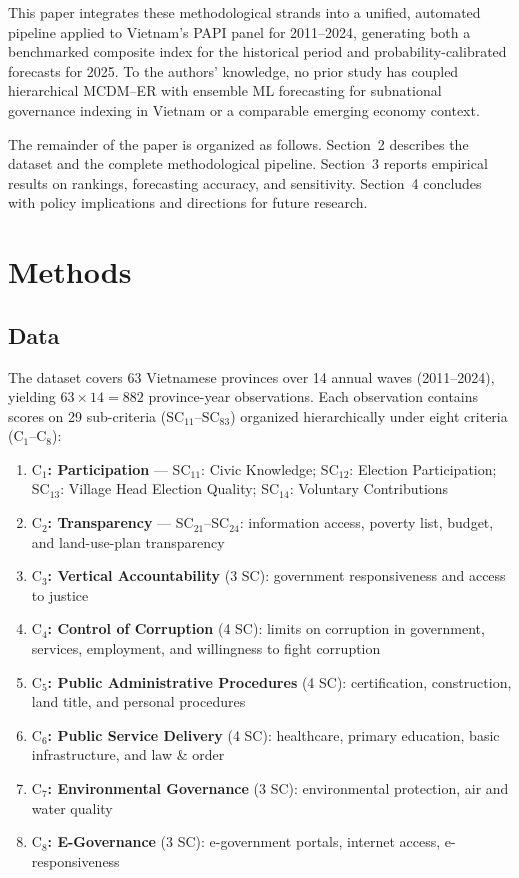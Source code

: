\documentclass[12pt, a4paper]{article}
\begin{document}
This paper integrates these methodological strands into a unified, automated
pipeline applied to Vietnam's PAPI panel for 2011--2024, generating both a
benchmarked composite index for the historical period and probability-calibrated
forecasts for 2025. To the authors' knowledge, no prior study has coupled
hierarchical MCDM--ER with ensemble ML forecasting for subnational governance
indexing in Vietnam or a comparable emerging economy context.

The remainder of the paper is organized as follows.  Section~2 describes the
dataset and the complete methodological pipeline.  Section~3 reports empirical
results on rankings, forecasting accuracy, and sensitivity.  Section~4 concludes
with policy implications and directions for future research.

\section{Methods}

\subsection{Data}

The dataset covers 63 Vietnamese provinces over 14 annual waves
(2011--2024), yielding $63 \times 14 = 882$ province-year observations.
Each observation contains scores on 29 sub-criteria ($\text{SC}_{11}$--$\text{SC}_{83}$)
organized hierarchically under eight criteria ($\text{C}_1$--$\text{C}_8$):

\begin{enumerate}[leftmargin=2em, itemsep=1pt]
  \item \textbf{$\text{C}_1$: Participation} --- SC$_{11}$: Civic Knowledge; SC$_{12}$: Election Participation; SC$_{13}$: Village Head Election Quality; SC$_{14}$: Voluntary Contributions
  \item \textbf{$\text{C}_2$: Transparency} --- SC$_{21}$--SC$_{24}$: information access, poverty list, budget, and land-use-plan transparency
  \item \textbf{$\text{C}_3$: Vertical Accountability} (3 SC): government responsiveness and access to justice
  \item \textbf{$\text{C}_4$: Control of Corruption} (4 SC): limits on corruption in government, services, employment, and willingness to fight corruption
  \item \textbf{$\text{C}_5$: Public Administrative Procedures} (4 SC): certification, construction, land title, and personal procedures
  \item \textbf{$\text{C}_6$: Public Service Delivery} (4 SC): healthcare, primary education, basic infrastructure, and law \& order
  \item \textbf{$\text{C}_7$: Environmental Governance} (3 SC): environmental protection, air and water quality
  \item \textbf{$\text{C}_8$: E-Governance} (3 SC): e-government portals, internet access, e-responsiveness
\end{enumerate}
\end{document}
